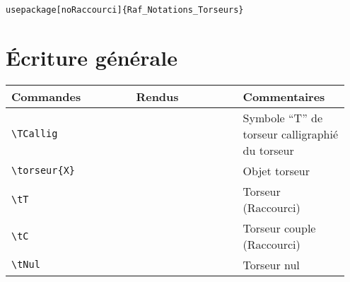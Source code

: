 \documentclass[a4paper,10pt]{article}
\newcommand{\rac}{({\color{red}Raccourci})}
\begin{document}
	\begin{verbatim}
usepackage[noRaccourci]{Raf_Notations_Torseurs}
	\end{verbatim}

	\section{Écriture générale}
	\noindent
	\begin{tabular}{|p{0.35\linewidth}|p{0.3\linewidth}|p{0.3\linewidth}|}
		\hline
			\textbf{Commandes}&\textbf{Rendus}&\textbf{Commentaires}
		\\\hline\hline
			\verb!\TCallig!			&	\TCallig		&	Symbole ``T'' de torseur calligraphié du torseur
		\\\hline
			\verb!\torseur{X}!		&	\torseur{X}		&	Objet torseur
		\\\hline
			\verb!\tT!			&	\tT			&	Torseur \TCallig \rac
		\\\hline
			\verb!\tC!			&	\tC			&	Torseur couple \rac
		\\\hline
			\verb!\tNul!			&	\tNul			&	Torseur nul
		\\\hline
	\end{tabular}
\end{document}
